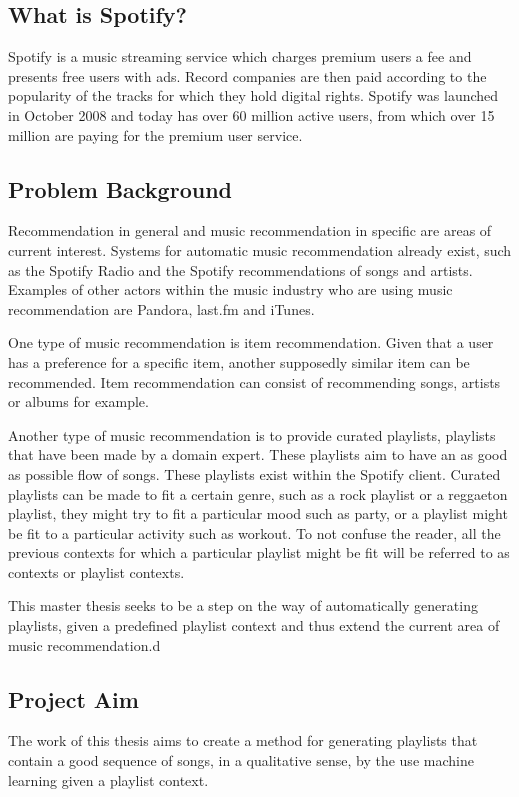 \documentclass[a4paper,11pt]{kth-mag}
\begin{document}
\subsection{What is Spotify?}
Spotify is a music streaming service which charges premium users a fee and presents free users with ads. Record companies are then paid according to the popularity of the tracks for which they hold digital rights. Spotify was launched in October 2008 and today has over 60 million active users, from which over 15 million are paying for the premium user service.

\subsection{Problem Background}
Recommendation in general and music recommendation in specific are areas of current interest. Systems for automatic music recommendation already exist, such as the Spotify Radio and the Spotify recommendations of songs and artists. Examples of other actors within the music industry who are using music recommendation are Pandora, last.fm and iTunes.

One type of music recommendation is item recommendation. Given that a user has a preference for a specific item, another supposedly similar item can be recommended. Item recommendation can consist of recommending songs, artists or albums for example.

Another type of music recommendation is to provide curated playlists, playlists that have been made by a domain expert. These playlists aim to have an as good as possible flow of songs. These playlists exist within the Spotify client. Curated playlists can be made to fit a certain genre, such as a rock playlist or a reggaeton playlist, they might try to fit a particular mood such as party, or a playlist might be fit to a particular activity such as workout. To not confuse the reader, all the previous contexts for which a particular playlist might be fit will be referred to as contexts or playlist contexts.

This master thesis seeks to be a step on the way of automatically generating playlists, given a predefined playlist context and thus extend the current area of music recommendation.d

\subsection{Project Aim}
The work of this thesis aims to create a method for generating playlists that contain a good sequence of songs, in a qualitative sense, by the use machine learning given a playlist context. 
\end{document}
